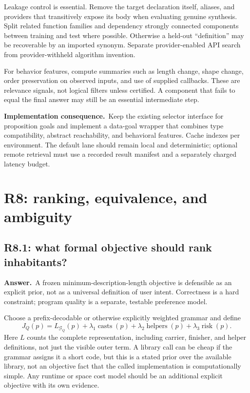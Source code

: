 \documentclass[11pt,a4paper]{article}
\theoremstyle{definition}
\theoremstyle{remark}
\newcommand{\ans}{\noindent\textbf{Answer.}\ }
\newcommand{\imp}{\par\noindent\textbf{Implementation consequence.}\ }
\begin{document}
Leakage control is essential. Remove the target declaration itself, aliases,
and providers that transitively expose its body when evaluating genuine
synthesis. Split related function families and dependency strongly connected
components between training and test where possible. Otherwise a held-out
``definition'' may be recoverable by an imported synonym. Separate
provider-enabled API search from provider-withheld algorithm invention.

For behavior features, compute summaries such as length change, shape change,
order preservation on observed inputs, and use of supplied callbacks. These
are relevance signals, not logical filters unless certified. A component that
fails to equal the final answer may still be an essential intermediate step.

\imp Keep the existing selector interface for proposition goals and implement
a data-goal wrapper that combines type compatibility, abstract reachability,
and behavioral features. Cache indexes per environment. The default lane
should remain local and deterministic; optional remote retrieval must use a
recorded result manifest and a separately charged latency budget.

\section{R8: ranking, equivalence, and ambiguity}\label{sec:r8}

\subsection{R8.1: what formal objective should rank inhabitants?}\label{q:R8.1}
\ans A frozen minimum-description-length objective is defensible as an explicit
prior, not as a universal definition of user intent. Correctness is a hard
constraint; program quality is a separate, testable preference model.

Choose a prefix-decodable or otherwise explicitly weighted grammar and define
\[
 J_Q(p)=L_{\mathcal G_Q}(p)+\lambda_1\operatorname{casts}(p)
       +\lambda_2\operatorname{helpers}(p)+\lambda_3\operatorname{risk}(p).
\]
Here $L$ counts the complete representation, including carrier, finisher, and
helper definitions, not just the visible outer term. A library call can be
cheap if the grammar assigns it a short code, but this is a stated prior over
the available library, not an objective fact that the called implementation
is computationally simple. Any runtime or space cost model should be an
additional explicit objective with its own evidence.
\end{document}

